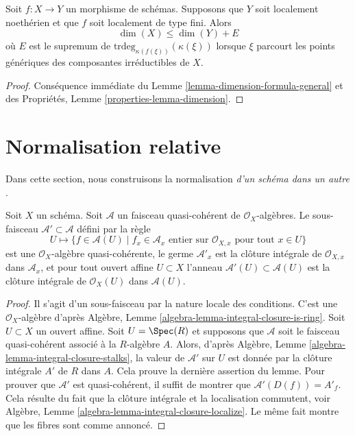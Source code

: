 \begin{lemma}
\label{lemma-alteration-dimension-general}
Soit $f : X \to Y$ un morphisme de schémas. Supposons que $Y$ soit
localement noethérien et que $f$ soit localement de type fini.
Alors
$$
\dim(X) \leq \dim(Y) + E
$$
où $E$ est le supremum de $\text{trdeg}_{\kappa(f(\xi))}(\kappa(\xi))$ lorsque $\xi$ parcourt
les points génériques des composantes irréductibles de
$X$.
\end{lemma}

\begin{proof}
Conséquence immédiate du Lemme \ref{lemma-dimension-formula-general} et
des Propriétés, Lemme \ref{properties-lemma-dimension}.
\end{proof}








\section{Normalisation relative}
\label{section-normalization-X-in-Y}

\noindent
Dans cette section, nous construisons la normalisation {\it d'un schéma dans un autre }.

\begin{lemma}
\label{lemma-integral-closure}
Soit $X$ un schéma. Soit $\mathcal{A}$ un faisceau quasi-cohérent
de $\mathcal{O}_X$-algèbres. Le sous-faisceau $\mathcal{A}' \subset \mathcal{A}$ défini
par la règle
$$
U \longmapsto \{f \in \mathcal{A}(U) \mid
f_x \in \mathcal{A}_x \text{ entier sur } \mathcal{O}_{X, x}
\text{ pour tout }x \in U\}
$$
est une $\mathcal{O}_X$-algèbre quasi-cohérente, le germe $\mathcal{A}'_x$
est la clôture intégrale de $\mathcal{O}_{X, x}$ dans $\mathcal{A}_x$,
et pour tout ouvert affine $U \subset X$
l'anneau $\mathcal{A}'(U) \subset \mathcal{A}(U)$ est la clôture
intégrale de $\mathcal{O}_X(U)$ dans $\mathcal{A}(U)$.
\end{lemma}

\begin{proof}
Il s'agit d'un sous-faisceau par la nature locale des conditions.
C'est une $\mathcal{O}_X$-algèbre
d'après Algèbre, Lemme \ref{algebra-lemma-integral-closure-is-ring}. Soit $U \subset X$ un
ouvert affine. Soit $U = \Spec(R)$ et supposons que $\mathcal{A}$
soit le faisceau quasi-cohérent associé à la $R$-algèbre
$A$. Alors, d'après Algèbre,
Lemme \ref{algebra-lemma-integral-closure-stalks}, la valeur de $\mathcal{A}'$ sur $U$
est donnée par la clôture intégrale $A'$ de
$R$ dans $A$. Cela prouve la dernière assertion
du lemme. Pour prouver que $\mathcal{A}'$ est quasi-cohérent,
il suffit de montrer que $\mathcal{A}'(D(f)) = A'_f$. Cela résulte du fait
que la clôture intégrale et la localisation commutent, voir
Algèbre, Lemme \ref{algebra-lemma-integral-closure-localize}. Le même fait montre
que les fibres sont comme annoncé.
\end{proof}


